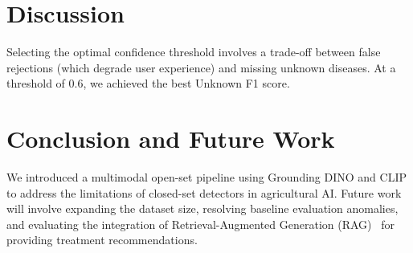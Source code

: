 \documentclass[runningheads]{llncs}
\begin{document}
\section{Discussion}
Selecting the optimal confidence threshold involves a trade-off between false rejections (which degrade user experience) and missing unknown diseases. At a threshold of 0.6, we achieved the best Unknown F1 score.

\section{Conclusion and Future Work}
We introduced a multimodal open-set pipeline using Grounding DINO and CLIP to address the limitations of closed-set detectors in agricultural AI. Future work will involve expanding the dataset size, resolving baseline evaluation anomalies, and evaluating the integration of Retrieval-Augmented Generation (RAG)~\cite{lewis2020retrieval} for providing treatment recommendations.



\end{document}

